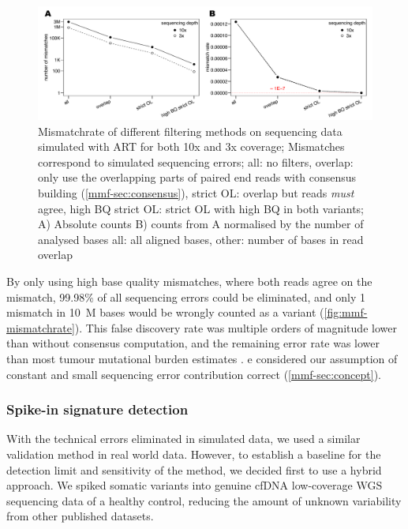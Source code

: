 \begin{figure}[ht]
\centering
\includegraphics[width=.99\linewidth]{Figures/MisMatchFinder/mismatchrateCleanSequencing.pdf}
\caption[Mismatchrate of different filtering methods]{Mismatchrate of different filtering methods on sequencing data simulated with ART\cite{Huang2011} for both 10x and 3x coverage; Mismatches correspond to simulated sequencing errors; all: no filters, overlap: only use the overlapping parts of paired end reads with consensus building (\protect\autoref{mmf-sec:consensus}), strict OL: overlap but reads \emph{must} agree, high BQ strict OL: strict OL with high BQ in both variants; A) Absolute counts B) counts from A normalised by the number of analysed bases all: all aligned bases, other: number of bases in read overlap}\label{fig:mmf-mismatchrate}
\end{figure}

By only using high base quality mismatches, where both reads agree on the mismatch, 99.98\% of all sequencing errors could be eliminated, and only 1 mismatch in 10~M bases would be wrongly counted as a variant (\autoref{fig:mmf-mismatchrate}). This false discovery rate was multiple orders of magnitude lower than without consensus computation, and the remaining error rate was lower than most tumour mutational burden estimates \cite{Alexandrov2020,Lawrence2013a}. e considered our assumption of constant and small sequencing error contribution correct (\autoref{mmf-sec:concept}).


\subsubsection{Spike-in signature detection}
\label{mmf-sec:simSignatures}
With the technical errors eliminated in simulated data, we used a similar validation method in real world data. However, to establish a baseline for the detection limit and sensitivity of the method, we decided first to use a hybrid approach. We spiked somatic variants into genuine cfDNA low-coverage WGS sequencing data of a healthy control, reducing the amount of unknown variability from other published datasets.

